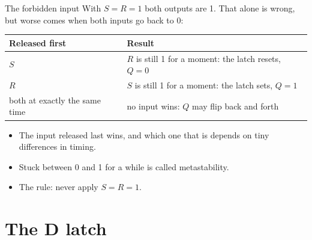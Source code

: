 \documentclass[10pt]{wosm-slides}
\begin{document}
\begin{frame}{The forbidden input}
  With $S = R = 1$ both outputs are 1. That alone is wrong, but worse comes when both
  inputs go back to 0:

  \medskip
  \begin{center}
    \begin{tabular}{@{}ll@{}}
      \toprule
      Released first & Result \\
      \midrule
      $S$ & $R$ is still 1 for a moment: the latch resets, $Q = 0$ \\
      $R$ & $S$ is still 1 for a moment: the latch sets, $Q = 1$ \\
      both at exactly the same time & no input wins: $Q$ may flip back and forth \\
      \bottomrule
    \end{tabular}
  \end{center}

  \medskip
  \begin{itemize}
    \item The input released \alert{last} wins, and which one that is depends on tiny
      differences in timing.
    \item Stuck between 0 and 1 for a while is called \alert{metastability}.
    \item The rule: never apply $S = R = 1$.
  \end{itemize}
\end{frame}

\section{The D latch}
\end{document}
